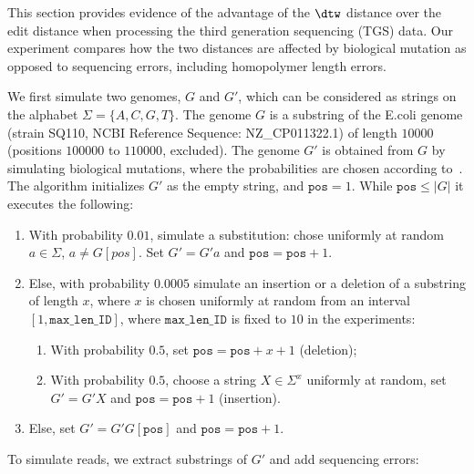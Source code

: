 This section provides evidence of the advantage of the $\dtw$ distance over the edit distance when processing the third generation sequencing (TGS) data. Our experiment compares how the two distances are affected by biological mutation as opposed to sequencing errors, including homopolymer length errors. 

We first simulate two genomes, $G$ and $G'$, which can be considered as strings on the alphabet $\Sigma = \{A,C,G,T\}$. The genome $G$ is a substring of the E.coli genome (strain SQ110, NCBI Reference Sequence: NZ\_CP011322.1) of length $10000$ (positions $100000$ to $110000$, excluded). The genome $G'$ is obtained from $G$ by simulating biological mutations, where the probabilities are chosen according to~\cite{10.1093/molbev/msp063}. The algorithm initializes $G'$ as the empty string, and $\texttt{pos} = 1$. While $\texttt{pos} \le |G|$ it executes the following:

\begin{enumerate}
	\item With probability $0.01$, simulate a substitution: chose  uniformly at random  $a \in \Sigma$, $a \neq G[pos]$. Set $G' = G'a$ and $\texttt{pos} = \texttt{pos} + 1$. 
	\item Else, with probability $0.0005$ simulate an insertion or a deletion of a substring of length $x$, where $x$ is chosen uniformly at random from an interval $[1, \texttt{max\_len\_ID}]$, where $\texttt{max\_len\_ID}$ is fixed to $10$ in the experiments:
		\begin{enumerate}
			\item With probability $0.5$, set $\texttt{pos} = \texttt{pos} + x + 1$ (deletion);
			\item With probability $0.5$, choose a string $X \in \Sigma^x$ uniformly at random, set $G' = G'X$ and $\texttt{pos}= \texttt{pos}+1$ (insertion).  
		\end{enumerate}
	\item Else, set $G' = G'G[\texttt{pos}]$ and $\texttt{pos} = \texttt{pos} + 1$. 
\end{enumerate}

\noindent To simulate reads, we extract substrings of $G'$ and add sequencing errors: 

